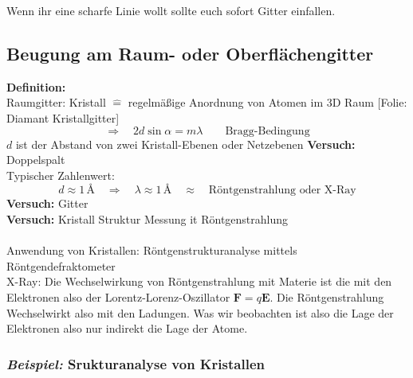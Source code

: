 \documentclass[titlepage,11pt,a4paper,ngerman]{report}
\newcommand{\tx}[1]{\textrm{#1}}
\newcommand{\folie}[1]{\color{gray}[Folie: #1]\color{black}}
\newcommand{\versuch}[1]{\color{red!50!black} \textbf{Versuch:} \color{black} #1\\ }
\renewcommand{\vec}[1]{\boldsymbol{#1}}
\newcommand{\lcom}[1]{\color{MidnightBlue}#1\color{black}}
\begin{document}
\lcom{Wenn ihr eine scharfe Linie wollt sollte euch sofort Gitter einfallen. }

\subsection{Beugung am Raum- oder Oberflächengitter}

\textbf{Definition:}\\
Raumgitter: Kristall $ \widehat{=} $ regelmäßige Anordnung von Atomen im 3D Raum \folie{Diamant Kristallgitter}
\begin{equation*}
\Rightarrow \quad 2 d \sin \alpha = m \lambda \qquad \tx{Bragg-Bedingung}
\end{equation*}
$ d $ ist der Abstand von zwei Kristall-Ebenen oder Netzebenen 
\versuch{Doppelspalt}

\noindent
Typischer Zahlenwert:
\begin{equation*}
d \approx 1 \, \tx{\AA} \quad \Rightarrow \quad \lambda \approx 1 \,  \tx{\AA} \quad \approx \quad \tx{Röntgenstrahlung oder X-Ray}
\end{equation*}
\versuch{Gitter}
\versuch{Kristall Struktur Messung it Röntgenstrahlung}\\
Anwendung von Kristallen: Röntgenstrukturanalyse mittels Röntgendefraktometer\\
X-Ray: \lcom{Die Wechselwirkung von Röntgenstrahlung mit Materie ist die mit den Elektronen also der Lorentz-Lorenz-Oszillator $ \vec{F} = q \vec{E} $. Die Röntgenstrahlung Wechselwirkt also mit den Ladungen. Was wir beobachten ist also die Lage der Elektronen also nur indirekt die Lage der Atome.}





\noindent
\subsubsection{\emph{Beispiel:} \textbf{Srukturanalyse von Kristallen}}
\end{document}
